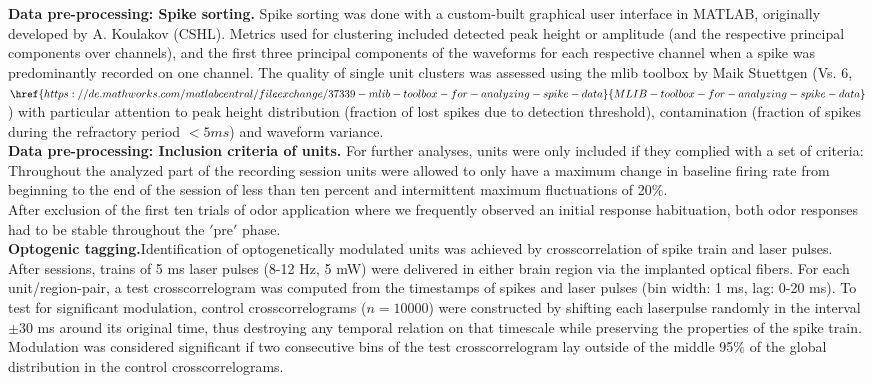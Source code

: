 \textbf{Data pre-processing: Spike sorting.} Spike sorting was done with a custom-built graphical user interface in MATLAB, originally developed by A. Koulakov (CSHL). Metrics used for clustering included detected peak height or amplitude (and the respective principal components over channels), and the first three principal components of the waveforms for each respective channel when a spike was predominantly recorded on one channel. The quality of single unit clusters was assessed using the mlib toolbox by Maik Stuettgen (Vs. 6, $\href{https://de.mathworks.com/matlabcentral/fileexchange/37339-mlib-toolbox-for-analyzing-spike-data}{MLIB-toolbox-for-analyzing-spike-data}$) with particular attention to peak height distribution (fraction of lost spikes due to detection threshold), contamination (fraction of spikes during the refractory period $<5ms$) and waveform variance.\\
\textbf{Data pre-processing: Inclusion criteria of units.} For further analyses, units were only included if they complied with a set of criteria: Throughout the analyzed part of the recording session units were allowed to only have a maximum change in baseline firing rate from beginning to the end of the session of less than ten percent and intermittent maximum fluctuations of 20$\%$.\\ After exclusion of the first ten trials of odor application where we frequently observed an initial response habituation, both odor responses had to be stable throughout the $'$pre$'$ phase.\\\textbf{Optogenic tagging.}Identification of optogenetically modulated units was achieved by crosscorrelation of spike train and laser pulses.\\After sessions, trains of 5 ms laser pulses (8-12 Hz, 5 mW) were delivered in either brain region via the implanted optical fibers. For each unit/region-pair, a test crosscorrelogram was computed from the timestamps of spikes and laser pulses (bin width: 1 ms, lag:  0-20 ms). To test for significant modulation, control crosscorrelograms ($n = 10000$) were constructed by shifting each laserpulse randomly in the interval $\pm$30 ms around its original time, thus destroying any temporal relation on that timescale while preserving the properties of the spike train. Modulation was considered significant if two consecutive bins of the test crosscorrelogram lay outside of the middle 95$\%$ of the global distribution in the control crosscorrelograms. 
